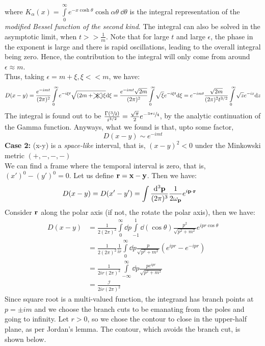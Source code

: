 where $K_\alpha(x) = \int\limits_0^\infty e^{-x\cosh\theta}\cosh\alpha \theta\ \dd\theta$ is the integral representation of the \textit{modified Bessel function of the second kind}. The integral can also be solved in the asymptotic limit, when $t>>\frac{1}{m}$. Note that for large $t$ and large $\epsilon$, the phase in the exponent is large and there is rapid oscillations, leading to the overall integral being zero. Hence, the contribution to the integral will only come from around $\epsilon \approx m $. \\[0.2cm]
Thus, taking $\epsilon = m+\xi, \xi<<m$, we have:
$$D(x-y) = \frac{e^{-imt}}{(2\pi)^2} \int\limits_0^\infty e^{-i\xi t}\sqrt{(2m+\xcancel{\ \xi\ })\xi}\dd\xi =  \frac{e^{-imt}\sqrt{2m}}{(2\pi)^2}\int\limits_0^\infty \sqrt{\xi}e^{-i\xi t}\dd\xi =  e^{-imt} \frac{\sqrt{2m}}{(2\pi)^2 t^{3/2}}\int\limits_0^\infty \sqrt{z}e^{-iz}\dd z$$
The integral is found out to be $\frac{\Gamma(\sfrac{3}{2})}{i^{3/2}} = \frac{\sqrt{\pi}}{2}e^{-\sfrac{3\pi i}{4}}$, by the analytic continuation of the Gamma function. Anyways, what we found is that, upto some factor, $$D(x-y) \sim e^{-imt}$$
\textbf{Case 2: } (x-y) is a \textit{space-like} interval, that is, $(x-y)^2<0$ under the Minkowski metric $(+,-,-,-)$\\[0.2cm]
We can find a frame where the temporal interval is zero, that is, $({x}')^0-({y}')^0 = 0$. Let us define $\vb{r} = \vb{x} - \vb{y}$. Then we have:
\begin{align*}
    D(x-y) = D(x'-y') &= \int \frac{\dd^3\vb{{\vb{p}}}}{(2\pi)^3}\frac{1}{2\omega_{\vb{{p}}}} e^{i \vb{p}\cdot \vb{r}}
\end{align*}
Consider $\vb{r}$ along the polar axis (if not, the rotate the polar axis), then we have:
\begin{align*}
    D(x-y) &= \frac{1}{2(2\pi)^2}\int\limits_0^\infty \dd p\int\limits_{-1}^1 \dd(\cos\theta)\frac{p^2}{\sqrt{p^2+m^2}} e^{i pr\cos\theta}\\ &= \frac{1}{2(2\pi)^2} \frac{1}{ir}\int\limits_0^\infty \dd p \frac{p}{\sqrt{p^2+m^2}}(e^{ipr}-e^{-ipr}) \\ &=\frac{1}{2ir(2\pi)^2 } \int\limits_{-\infty}^\infty \dd p \frac{pe^{ipr}}{\sqrt{p^2+m^2}}\\
    &=\frac{\mathcal{I}}{2ir(2\pi)^2 } 
\end{align*}
Since square root is a multi-valued function, the integrand has branch points at $p = \pm im$ and we choose the branch cuts to be emanating from the poles and going to infinity. Let $r>0$, so we chose the contour to close in the upper-half plane, as per Jordan's lemma. The contour, which avoids the branch cut, is shown below.
